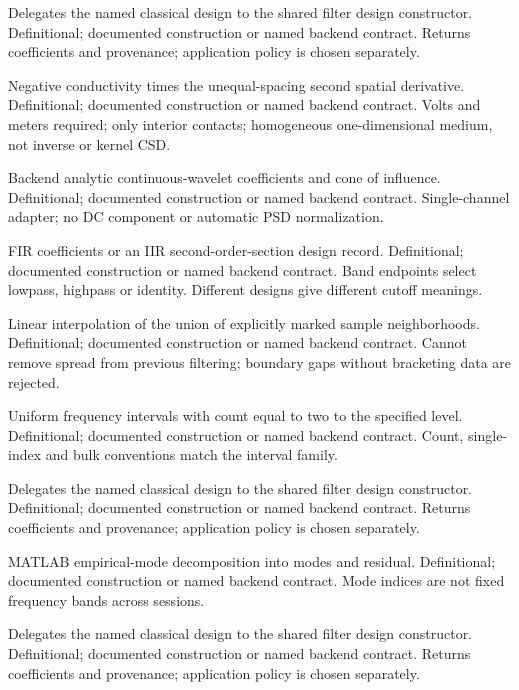{Delegates the named classical design to the shared filter design constructor.}
{Definitional; documented construction or named backend contract.}
{Returns coefficients and provenance; application policy is chosen separately.}

{Negative conductivity times the unequal-spacing second spatial derivative.}
{Definitional; documented construction or named backend contract.}
{Volts and meters required; only interior contacts; homogeneous one-dimensional medium, not inverse or kernel CSD.}

{Backend analytic continuous-wavelet coefficients and cone of influence.}
{Definitional; documented construction or named backend contract.}
{Single-channel adapter; no DC component or automatic PSD normalization.}

{FIR coefficients or an IIR second-order-section design record.}
{Definitional; documented construction or named backend contract.}
{Band endpoints select lowpass, highpass or identity. Different designs give different cutoff meanings.}

{Linear interpolation of the union of explicitly marked sample neighborhoods.}
{Definitional; documented construction or named backend contract.}
{Cannot remove spread from previous filtering; boundary gaps without bracketing data are rejected.}

{Uniform frequency intervals with count equal to two to the specified level.}
{Definitional; documented construction or named backend contract.}
{Count, single-index and bulk conventions match the interval family.}

{Delegates the named classical design to the shared filter design constructor.}
{Definitional; documented construction or named backend contract.}
{Returns coefficients and provenance; application policy is chosen separately.}

{MATLAB empirical-mode decomposition into modes and residual.}
{Definitional; documented construction or named backend contract.}
{Mode indices are not fixed frequency bands across sessions.}

{Delegates the named classical design to the shared filter design constructor.}
{Definitional; documented construction or named backend contract.}
{Returns coefficients and provenance; application policy is chosen separately.}

